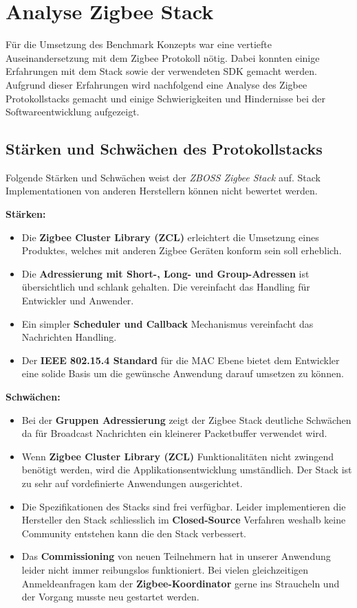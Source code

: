 \clearpage
\section{Analyse Zigbee Stack}\label{sec:AnalyseZigbeeStack}
Für die Umsetzung des Benchmark Konzepts war eine vertiefte Auseinandersetzung mit dem Zigbee Protokoll nötig.
Dabei konnten einige Erfahrungen mit dem Stack sowie der verwendeten SDK gemacht werden.
Aufgrund dieser Erfahrungen wird nachfolgend eine Analyse des Zigbee Protokollstacks gemacht und einige Schwierigkeiten und Hindernisse bei der Softwareentwicklung aufgezeigt.


\subsection{Stärken und Schwächen des Protokollstacks}\label{subsec:ZigbeeStärkenundSchwächendesProtokollstacks}
Folgende Stärken und Schwächen weist der \textit{ZBOSS Zigbee Stack} auf.
Stack Implementationen von anderen Herstellern können nicht bewertet werden.

\textbf{Stärken:}
\begin{itemize}
\item Die \textbf{Zigbee Cluster Library (ZCL)} erleichtert die Umsetzung eines Produktes, welches mit anderen Zigbee Geräten konform sein soll erheblich.
\item Die \textbf{Adressierung mit Short-, Long- und Group-Adressen} ist übersichtlich und schlank gehalten.
Die vereinfacht das Handling für Entwickler und Anwender.
\item Ein simpler \textbf{Scheduler und Callback} Mechanismus vereinfacht das Nachrichten Handling.
\item Der \textbf{IEEE 802.15.4 Standard} für die MAC Ebene bietet dem Entwickler eine solide Basis um die gewünsche Anwendung darauf umsetzen zu können.
\end{itemize}

\textbf{Schwächen:}
\begin{itemize}
\item Bei der \textbf{Gruppen Adressierung} zeigt der Zigbee Stack deutliche Schwächen da für Broadcast Nachrichten ein kleinerer Packetbuffer verwendet wird.
\item Wenn \textbf{Zigbee Cluster Library (ZCL)} Funktionalitäten nicht zwingend benötigt werden, wird die Applikationsentwicklung umständlich.
Der Stack ist zu sehr auf vordefinierte Anwendungen ausgerichtet.
\item Die Spezifikationen des Stacks sind frei verfügbar. Leider implementieren die Hersteller den Stack schliesslich im \textbf{Closed-Source} Verfahren weshalb keine Community entstehen kann die den Stack verbessert.
\item Das \textbf{Commissioning} von neuen Teilnehmern hat in unserer Anwendung leider nicht immer reibungslos funktioniert.
Bei vielen gleichzeitigen Anmeldeanfragen kam der \textbf{Zigbee-Koordinator} gerne ins Straucheln und der Vorgang musste neu gestartet werden.
\end{itemize}


